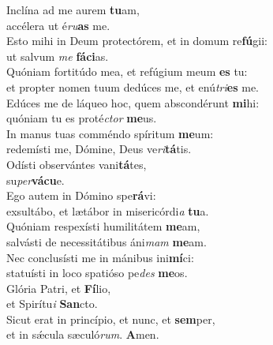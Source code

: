\evenverse Inclína ad me aurem \textbf{tu}am,~\*\\
\evenverse accélera ut é\textit{ru}\textbf{as} me.\\
\oddverse Esto mihi in Deum protectórem, et in domum re\textbf{fú}gii:~\*\\
\oddverse ut salvum \textit{me} \textbf{fá}\textbf{ci}as.\\
\evenverse Quóniam fortitúdo mea, et refúgium meum \textbf{es} tu:~\*\\
\evenverse et propter nomen tuum dedúces me, et enú\textit{tri}\textbf{es} me.\\
\oddverse Edúces me de láqueo hoc, quem abscondérunt \textbf{mi}hi:~\*\\
\oddverse quóniam tu es proté\textit{ctor} \textbf{me}us.\\
\evenverse In manus tuas comméndo spíritum \textbf{me}um:~\*\\
\evenverse redemísti me, Dómine, Deus ve\textit{ri}\textbf{tá}tis.\\
\oddverse Odísti observántes vani\textbf{tá}tes,~\*\\
\oddverse su\textit{per}\textbf{vá}\textbf{cu}e.\\
\evenverse Ego autem in Dómino spe\textbf{rá}vi:~\*\\
\evenverse exsultábo, et lætábor in misericórdi\textit{a} \textbf{tu}a.\\
\oddverse Quóniam respexísti humilitátem \textbf{me}am,~\*\\
\oddverse salvásti de necessitátibus áni\textit{mam} \textbf{me}am.\\
\evenverse Nec conclusísti me in mánibus ini\textbf{mí}ci:~\*\\
\evenverse statuísti in loco spatióso pe\textit{des} \textbf{me}os.\\
\oddverse Glória Patri, et \textbf{Fí}lio,~\*\\
\oddverse et Spirítu\textit{i} \textbf{San}cto.\\
\evenverse Sicut erat in princípio, et nunc, et \textbf{sem}per,~\*\\
\evenverse et in sǽcula sæculó\textit{rum}. \textbf{A}men.\\
